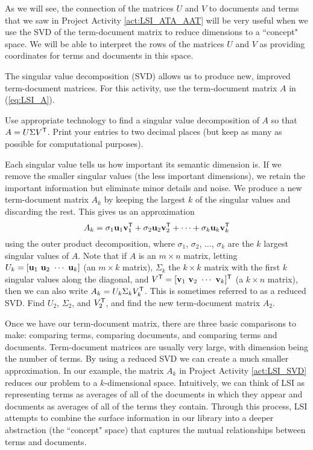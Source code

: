 As we will see, the connection of the matrices $U$ and $V$ to documents and terms that we saw in Project Activity \ref{act:LSI_ATA_AAT} will be very useful when we use the SVD of the term-document matrix to reduce dimensions to a ``concept" space. We will be able to interpret the rows of the matrices $U$ and $V$ as providing coordinates for terms and documents in this space. 

\begin{pactivity} \label{act:LSI_SVD} The singular value decomposition (SVD) allows us to produce new, improved term-document matrices. For this activity, use the term-document matrix $A$ in (\ref{eq:LSI_A}). 
\ba
\item Use appropriate technology to find a singular value decomposition of $A$ so that $A = U \Sigma V^{\mathsf{T}}$. Print your entries to two decimal places (but keep as many as possible for computational purposes). %

\item Each singular value tells us how important its semantic dimension is. If we remove the smaller singular values (the less important dimensions), we retain the important information but eliminate minor details and noise. We produce a new term-document matrix $A_k$ by keeping the largest $k$ of the singular values and discarding the rest. This gives us an approximation 
\[A_k = \sigma_1 \mathbf{u}_1\mathbf{v}_1^{\mathsf{T}} + \sigma_2 \mathbf{u}_2\mathbf{v}_2^{\mathsf{T}} + \cdots + \sigma_k \mathbf{u}_k\mathbf{v}_k^{\mathsf{T}}\]
using the outer product decomposition, where $\sigma_1$, $\sigma_2$, $\ldots$, $\sigma_k$ are the $k$ largest singular values of $A$. Note that if $A$ is an $m \times n$ matrix, letting $U_k = [\mathbf{u}_1 \ \mathbf{u}_2 \ \cdots \ \mathbf{u}_k]$ (an $m \times k$ matrix), $\Sigma_k$ the $k \times k$ matrix with the first $k$ singular values along the diagonal, and $V^{\mathsf{T}} = [\mathbf{v}_1 \ \mathbf{v}_2 \ \cdots \ \mathbf{v}_k ]^{\mathsf{T}}$ (a $k \times n$ matrix), then we can also write $A_k = U_k \Sigma_k V_k^{\mathsf{T}} $. This is sometimes referred to as a reduced SVD.  Find $U_2$, $\Sigma_2$, and $V_2^{\mathsf{T}}$, and find the new term-document matrix $A_2$. 


\ea

\end{pactivity}

Once we have our term-document matrix, there are three basic comparisons to make: comparing terms, comparing documents, and comparing terms and documents. Term-document matrices are usually very large, with dimension being the number of terms. By using a reduced SVD we can create a much smaller approximation. In our example, the matrix $A_k$ in Project Activity \ref{act:LSI_SVD} reduces our problem to a $k$-dimensional space. Intuitively, we can think of LSI as representing terms as averages of all of the documents in which they appear and documents as averages of all of the terms they contain. Through this process, LSI attempts to combine the surface information in our library into a deeper abstraction (the ``concept" space) that captures the mutual relationships between terms and documents. 

